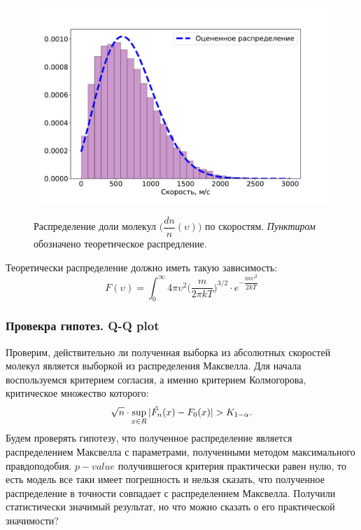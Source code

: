 \documentclass[twoside,twocolumn, 11pt]{article}
\theoremstyle{plain}
\theoremstyle{definition}
\DeclarePairedDelimiter\abs{\lvert}{\rvert} %
\begin{document}
\begin{figure}[!h]
{\includegraphics[width=1\linewidth]{hist_v}}
\caption{Распределение доли молекул $\Big(\dfrac{dn}{n} (\upsilon) \Big)$ по скоростям. \textit{Пунктиром} обозначено теоретическое распредление. }
\end{figure}

\indent Теоретически распределение должно иметь такую зависимость:
\begin{equation}
F(\upsilon) = \int_0^\infty 4\pi\upsilon^2 \Big( \dfrac{m}{2\pi kT} \Big)^{3/2}\cdot e^{-\dfrac{m \upsilon^2}{2kT}}
\end{equation}

\subsubsection{Провекра гипотез. Q-Q plot}
Проверим, действительно ли полученная выборка из абсолютных скоростей молекул является выборкой из распределения Максвелла. Для начала воспользуемся критерием согласия,
а именно критерием Колмогорова, критическое множество которого:
\[\sqrt{n} \cdot \sup\limits_{x \in R}{\abs{\hat{F_n}(x)- F_0(x)} > K_{1-\alpha}}. \]
Будем проверять гипотезу, что полученное распределение является распределением Максвелла с параметрами, полученными методом максимального правдоподобия. $p-value$ получившегося критерия
практически равен нулю, то есть модель все таки имеет погрешность и нельзя сказать, что полученное распределение в точности совпадает с распределением Максвелла. Получили статистически значимый результат,
но что можно сказать о его практической значимости?
\end{document}
